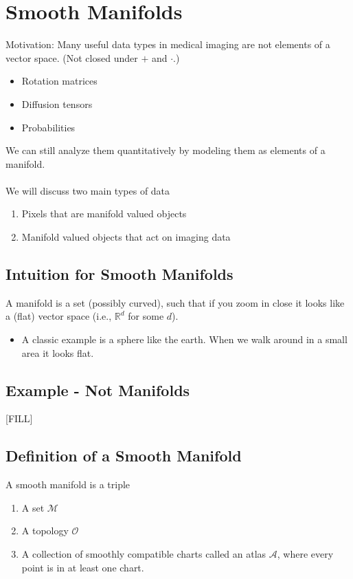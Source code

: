\documentclass[10pt]{article}
\begin{document}
\section*{Smooth Manifolds}
Motivation: Many useful data types in medical imaging are not elements of a vector space.  (Not closed under $+$ and $\cdot$.)
\begin{itemize}
    \item Rotation matrices
    \item Diffusion tensors
    \item Probabilities
\end{itemize}
We can still analyze them quantitatively by modeling them as elements of a manifold.\\\\
We will discuss two main types of data
\begin{enumerate}
    \item Pixels that are manifold valued objects
    \item Manifold valued objects that act on imaging data
\end{enumerate}
\subsection*{Intuition for Smooth Manifolds}
A manifold is a set (possibly curved), such that if you zoom in close it looks like a (flat) vector space (i.e., $\mathbb{R}^d$ for some $d$).
\begin{itemize}
    \item A classic example is a sphere like the earth.  When we walk around in a small area it looks flat.
\end{itemize}


\subsection*{Example - Not Manifolds}
\begin{center}
    [FILL]
\end{center}

\subsection*{Definition of a Smooth Manifold}
A smooth manifold is a triple
\begin{enumerate}
    \item A set $\mathcal{M}$
    \item A topology $\mathcal{O}$
    \item A collection of smoothly compatible charts called an atlas $\mathcal{A}$, where every point is in at least one chart.
\end{enumerate}
\end{document}
